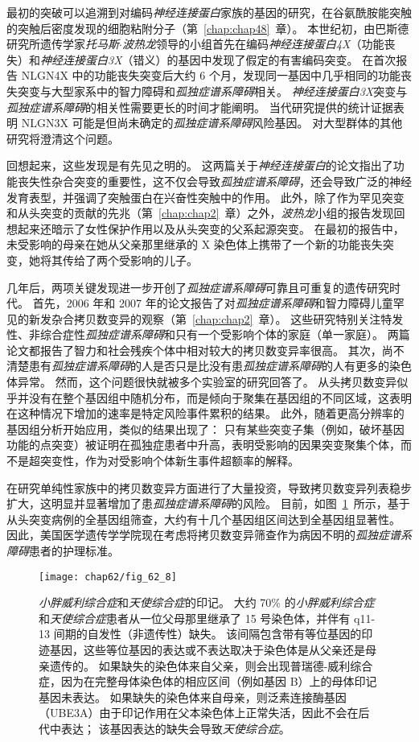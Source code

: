 最初的突破可以追溯到对编码\textit{神经连接蛋白}家族的基因的研究，在谷氨酰胺能突触的突触后密度发现的细胞粘附分子（第~\ref{chap:chap48}~章）。
本世纪初，由巴斯德研究所遗传学家\textit{托马斯$\cdot$波热龙}领导的小组首先在编码\textit{神经连接蛋白4X}（功能丧失）和\textit{神经连接蛋白3X}（错义）的基因中发现了假定的有害编码突变。
在首次报告 NLGN4X 中的功能丧失突变后大约 6 个月，发现同一基因中几乎相同的功能丧失突变与大型家系中的智力障碍和\textit{孤独症谱系障碍}相关。
\textit{神经连接蛋白3X}突变与\textit{孤独症谱系障碍}的相关性需要更长的时间才能阐明。
当代研究提供的统计证据表明 NLGN3X 可能是但尚未确定的\textit{孤独症谱系障碍}风险基因。
对大型群体的其他研究将澄清这个问题。


回想起来，这些发现是有先见之明的。
这两篇关于\textit{神经连接蛋白}的论文指出了功能丧失性杂合突变的重要性，这不仅会导致\textit{孤独症谱系障碍}，还会导致广泛的神经发育表型，并强调了突触蛋白在兴奋性突触中的作用。
此外，除了作为罕见突变和从头突变的贡献的先兆（第~\ref{chap:chap2}~章）之外，\textit{波热龙}小组的报告发现回想起来还暗示了女性保护作用以及从头突变的父系起源突变。
在最初的报告中，未受影响的母亲在她从父亲那里继承的 X 染色体上携带了一个新的功能丧失突变，她将其传给了两个受影响的儿子。


几年后，两项关键发现进一步开创了\textit{孤独症谱系障碍}可靠且可重复的遗传研究时代。
首先，2006 年和 2007 年的论文报告了对\textit{孤独症谱系障碍}和智力障碍儿童罕见的新发杂合拷贝数变异的观察（第~\ref{chap:chap2}~章）。
这些研究特别关注特发性、非综合症性\textit{孤独症谱系障碍}和只有一个受影响个体的家庭（单一家庭）。
两篇论文都报告了智力和社会残疾个体中相对较大的拷贝数变异率很高。
其次，尚不清楚患有\textit{孤独症谱系障碍}的人是否只是比没有患\textit{孤独症谱系障碍}的人有更多的染色体异常。
然而，这个问题很快就被多个实验室的研究回答了。
从头拷贝数变异似乎并没有在整个基因组中随机分布，而是倾向于聚集在基因组的不同区域，这表明在这种情况下增加的速率是特定风险事件累积的结果。
此外，随着更高分辨率的基因组分析开始应用，类似的结果出现了：
只有某些突变子集（例如，破坏基因功能的点突变）被证明在孤独症患者中升高，表明受影响的因果突变聚集个体，而不是超突变性，作为对受影响个体新生事件超额率的解释。


在研究单纯性家族中的拷贝数变异方面进行了大量投资，导致拷贝数变异列表稳步扩大，这明显并显著增加了患\textit{孤独症谱系障碍}的风险。
目前，如图~\ref{fig:62_8}~所示，基于从头突变病例的全基因组筛查，大约有十几个基因组区间达到全基因组显著性。
因此，美国医学遗传学学院现在考虑将拷贝数变异筛查作为病因不明的\textit{孤独症谱系障碍}患者的护理标准。


\begin{figure}[htbp]
	\centering
	\texttt{[image: chap62/fig\_62\_8]}
	\caption{\textit{小胖威利综合症}和\textit{天使综合症}的印记。
		大约 70\% 的\textit{小胖威利综合症}和\textit{天使综合症}患者从一位父母那里继承了 15 号染色体，并伴有 q11-13 间期的自发性（非遗传性）缺失。
		该间隔包含带有等位基因的印迹基因，这些等位基因的表达或不表达取决于染色体是从父亲还是母亲遗传的。
		如果缺失的染色体来自父亲，则会出现普瑞德-威利综合症，因为在完整母体染色体的相应区间（例如基因 B）上的母体印记基因未表达。
		如果缺失的染色体来自母亲，则泛素连接酶基因（UBE3A）由于印记作用在父本染色体上正常失活，因此不会在后代中表达；
		该基因表达的缺失会导致\textit{天使综合症}。}
	\label{fig:62_8}
\end{figure}


